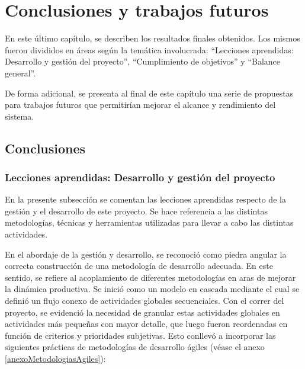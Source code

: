 \chapter{Conclusiones y trabajos futuros}
\par
En este último capítulo, se describen los resultados finales obtenidos. Los mismos fueron divididos en áreas según la temática involucrada: ``Lecciones aprendidas: Desarrollo y gestión del proyecto'', ``Cumplimiento de objetivos'' y ``Balance general''. 
\par De forma adicional, se presenta al final de este capítulo una serie de propuestas para trabajos futuros que permitirían mejorar el alcance y rendimiento del sistema.

\section{Conclusiones} 
    \subsection{Lecciones aprendidas: Desarrollo y gestión del proyecto}
        \par En la presente subsección se comentan las lecciones aprendidas respecto de la gestión y el desarrollo de este proyecto. Se hace referencia a las distintas metodologías, técnicas y herramientas utilizadas para llevar a cabo las distintas actividades.
        
        \par En el abordaje de la gestión y desarrollo, se reconoció como piedra angular la correcta construcción de una metodología de desarrollo adecuada. En este sentido, se refiere al acoplamiento de diferentes metodologías en aras de mejorar la dinámica productiva. Se inició como un modelo en cascada mediante el cual se definió un flujo conexo de actividades globales secuenciales. Con el correr del proyecto, se evidenció la necesidad de granular estas actividades globales en actividades más pequeñas con mayor detalle, que luego fueron reordenadas en función de criterios y prioridades subjetivas. Esto conllevó a incorporar las siguientes prácticas de metodologías de desarrollo ágiles (véase el anexo \ref{anexoMetodologiasAgiles}):
        
